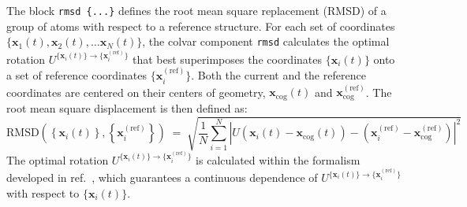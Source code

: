 The block \texttt{rmsd~\{...\}} defines the root mean square replacement
(RMSD) of a group of atoms with respect to a reference structure.  For
each set of coordinates $\{ \mathbf{x}_1(t), \mathbf{x}_2(t), \ldots
\mathbf{x}_N(t) \}$, the colvar component \texttt{rmsd} calculates the
optimal rotation
$U^{\{\mathbf{x}_{i}(t)\}\rightarrow\{\mathbf{x}_{i}^{\mathrm{(ref)}}\}}$
that best superimposes the coordinates $\{\mathbf{x}_{i}(t)\}$ onto a
set of reference coordinates $\{\mathbf{x}_{i}^{\mathrm{(ref)}}\}$.
Both the current and the reference coordinates are centered on their
centers of geometry, $\mathbf{x}_{\mathrm{cog}}(t)$ and
$\mathbf{x}_{\mathrm{cog}}^{\mathrm{(ref)}}$.  The root mean square
displacement is then defined as:
\begin{equation}
  \label{eq:cvc_rmsd}
  { \mathrm{RMSD}\left(\left\{\mathbf{x}_{i}\left(t\right)\right\},
    \left\{\mathbf{x}_{i}^{\mathrm{(ref)}}\right\}\right) } \; = \; \sqrt{
    \frac{1}{N} \sum_{i=1}^{N} \left|
      U
      \left(\mathbf{x}_{i}(t) - \mathbf{x}_{\mathrm{cog}}(t)\right) -
      \left(\mathbf{x}_{i}^{\mathrm{(ref)}} -
        \mathbf{x}_{\mathrm{cog}}^{\mathrm{(ref)}} \right) \right|^{2} }
\end{equation}
The optimal rotation
$U^{\{\mathbf{x}_{i}(t)\}\rightarrow\{\mathbf{x}_{i}^{\mathrm{(ref)}}\}}$
is calculated within the formalism developed in
ref.\ \citealp{Coutsias2004}, which guarantees a continuous
dependence of
$U^{\{\mathbf{x}_{i}(t)\}\rightarrow\{\mathbf{x}_{i}^{\mathrm{(ref)}}\}}$
with respect to $\{\mathbf{x}_{i}(t)\}$.

